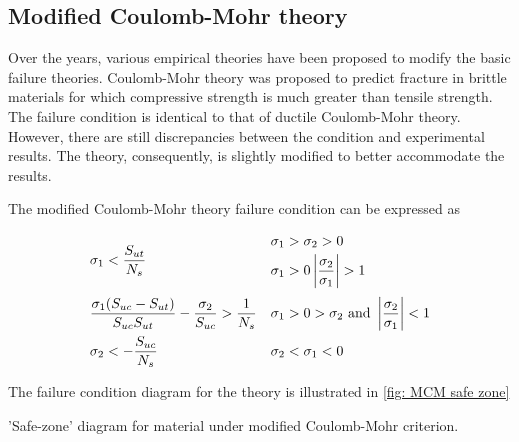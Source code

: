 \documentclass[
fontsize=10pt,
a4paper,
twosides=false,
open=any,
svgnames,
]{kaobook} %
\begin{document}
\subsection{Modified Coulomb-Mohr theory}

Over the years, various empirical theories have been proposed to modify the basic failure theories. Coulomb-Mohr theory was proposed to predict fracture in brittle materials for which compressive strength is much greater than tensile strength. The failure condition is identical to that of ductile Coulomb-Mohr theory. However, there are still discrepancies between the condition and experimental results. The theory, consequently, is slightly modified to better accommodate the results.

The modified Coulomb-Mohr theory failure condition can be expressed as

\begin{equation}
  \begin{array}{ll}
    \sigma_1 < \dfrac{S_{ut}}{N_s} &
      \begin{gathered}
        \sigma_1 > \sigma_2 > 0 \hfill \\ 
        \sigma_1 > 0 \left| \dfrac{\sigma_2}{\sigma_1} \right| > 1 
      \end{gathered} \\[20pt]
    \dfrac{\sigma_1(S_{uc} - S_{ut})}{S_{uc}S_{ut}} - \dfrac{\sigma_2}{S_{uc}} > \dfrac{1}{N_s} & \sigma_1 > 0 > \sigma_2\text{ and }\left| \dfrac{\sigma_2}{\sigma_1} \right| < 1 \\[10pt]
    \sigma_2 <  -\dfrac{S_{uc}}{N_s} & \sigma_2 < \sigma_1 < 0
  \end{array}
\end{equation}

The failure condition diagram for the theory is illustrated in \cref{fig: MCM safe zone}

\begin{marginfigure}
  \centering
  \caption{'Safe-zone' diagram for material under modified Coulomb-Mohr criterion.}
  \label{fig: MCM safe zone}
\end{marginfigure}
\end{document}
